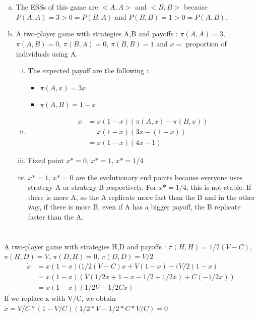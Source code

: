 \documentclass[11pt]{article}
\begin{document}
\section{}
\begin{enumerate}[(a)]
	\item The ESSs of this game are $<A,A>$ and $<B,B>$ because $P(A,A) = 3 > 0 = P(B,A)$ and $P(B,B) = 1 > 0 = P(A,B)$.
	
	\item A two-player game with strategies A,B and payoffs :  $\pi(A,A) = 3 $, $\pi(A,B) = 0 $, $\pi(B, A) = 0 $, $\pi(B,B) = 1 $ and $x = $ proportion of individuals using A.
	\begin{enumerate}[i.]
		\item The expected payoff are the following : 
		\begin{itemize}
			\item $\pi(A,x) = 3x $
			\item $\pi(A,B) = 1-x$
		\end{itemize}
		
		\item
		\begin{align*}
		\dot{x} &= x(1-x)(\pi(A,x)-\pi(B,x)) \\
				&= x(1-x)(3x-(1-x)) \\
				&= x(1-x)(4x-1)
		\end{align*} 
		
		
		\item Fixed point $x* = 0$, $x* = 1$, $x* = 1/4$
		
		\item $x* = 1$, $x* = 0$ are the evolutionary end points because everyone uses strategy A or strategy B respectively. For  $x* = 1/4$, this is not stable. If there is more A, so the A replicate more fast than the B and in the other way, if there is more B, even if A has a bigger payoff, the B replicate faster than the A.
	\end{enumerate}
\end{enumerate}

\section{}
A two-player game with strategies H,D and payoffs :  $\pi(H,H) = 1/2(V-C) $, $\pi(H,D) = V $, $\pi(D,H) = 0 $, $\pi(D,D) = V/2 $
\begin{align*}
\dot{x} & = x(1-x)(1/2(V-C)x+V(1-x)-(V/2(1-x) \\
& = x(1-x)(V(1/2x+1-x-1/2+1/2x) + C(-1/2x)) \\
& = x(1-x)(1/2V - 1/2Cx)
\end{align*}
If we replace x with V/C, we obtain $\dot{x} = V/C*(1-V/C)(1/2*V-1/2*C*V/C) = 0$
\end{document}

